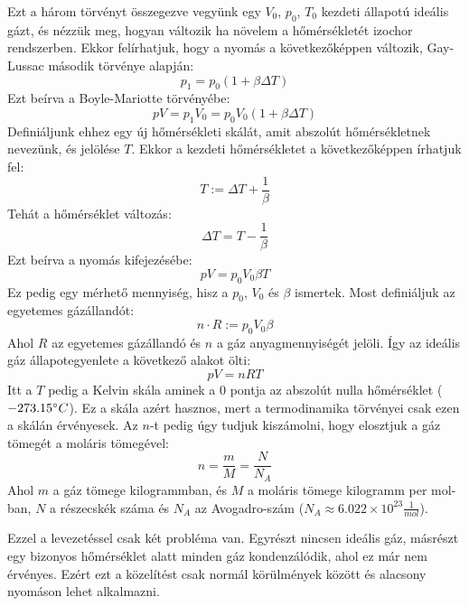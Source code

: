 \documentclass[../main.tex]{subfiles}
\begin{document}
Ezt a három törvényt összegezve vegyünk egy $V_0$, $p_0$, $T_0$ kezdeti állapotú ideális gázt, és nézzük meg, hogyan változik ha növelem a hőmérsékletét izochor rendszerben. 
Ekkor felírhatjuk, hogy a nyomás a következőképpen változik, Gay-Lussac második törvénye alapján:
\begin{equation}
    p_1 = p_0 (1 + \beta \Delta T)
\end{equation}
Ezt beírva a Boyle-Mariotte törvényébe:
\begin{equation}
    pV = p_1 V_0 = p_0 V_0(1 + \beta \Delta T)
\end{equation}
Definiáljunk ehhez egy új hőmérsékleti skálát, amit abszolút hőmérsékletnek nevezünk, és jelölése $T$. Ekkor a kezdeti hőmérsékletet a következőképpen írhatjuk fel:
\begin{equation}
    T := \Delta T + \frac{1}{\beta}
\end{equation}
Tehát a hőmérséklet változás:
\begin{equation}
    \Delta T = T - \frac{1}{\beta}
\end{equation}
Ezt beírva a nyomás kifejezésébe:
\begin{equation}
    pV = p_0 V_0 \beta T
\end{equation}
Ez pedig egy mérhető mennyiség, hisz a $p_0$, $V_0$ és $\beta$ ismertek. Most definiáljuk az egyetemes gázállandót:
\begin{equation}
    n \cdot R := p_0 V_0 \beta
\end{equation}
Ahol $R$ az egyetemes gázállandó és $n$ a gáz anyagmennyiségét jelöli. Így az ideális gáz állapotegyenlete a következő alakot ölti:
\begin{equation}
    pV = nRT
\end{equation}
Itt a $T$ pedig a Kelvin skála aminek a 0 pontja az abszolút nulla hőmérséklet ($-273.15\degree C$). Ez a skála azért hasznos, mert a termodinamika törvényei csak ezen a skálán érvényesek.
Az $n$-t pedig úgy tudjuk kiszámolni, hogy elosztjuk a gáz tömegét a moláris tömegével:
\begin{equation}
    n = \frac{m}{M} = \frac{N}{N_A}
\end{equation}
Ahol $m$ a gáz tömege kilogrammban, és $M$ a moláris tömege kilogramm per mol-ban, $N$ a részecskék száma és $N_A$ az Avogadro-szám ($N_A \approx 6.022 \times 10^{23} \frac{1}{mol}$).

Ezzel a levezetéssel csak két probléma van. Egyrészt nincsen ideális gáz, másrészt egy bizonyos hőmérséklet alatt minden gáz kondenzálódik, ahol ez már nem érvényes.
Ezért ezt a közelítést csak normál körülmények között és alacsony nyomáson lehet alkalmazni.
\end{document}
